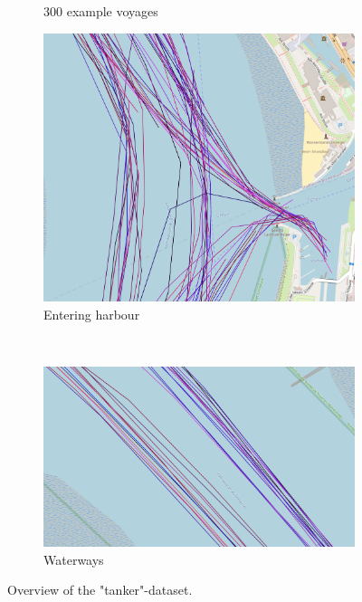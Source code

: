 \begin{figure}[H]
\begin{minipage}{.44\linewidth}
\begin{subfigure}[t]{.9\linewidth}
                \caption{300 example voyages}
                \label{fig:tankerOverview}
            \end{subfigure}
        \end{minipage}
    \begin{minipage}{.44\linewidth}
        \begin{subfigure}[t]{.9\linewidth}
            \includegraphics[width=\textwidth]{images/ais/tracks/tanker_partial.png}
            \caption{Entering harbour}
            \label{fig:tankerEntering}
        \end{subfigure} \\
        \begin{subfigure}[b]{.9\linewidth}
            \includegraphics[width=\textwidth]{images/ais/tracks/tanker_fahrrinnen.png}
            \caption{Waterways}
            \label{fig:tankerWaterway}
        \end{subfigure} 
    \end{minipage}
    \caption{Overview of the "tanker"-dataset.}
    \label{fig:tankerTracks}
\end{figure}
\par

